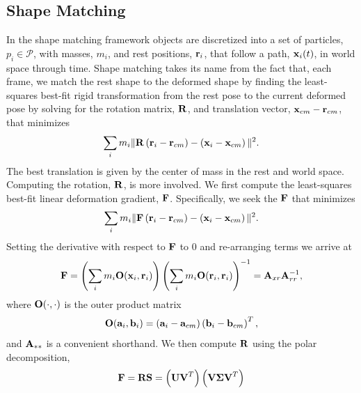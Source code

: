 \documentclass[review]{acmsiggraph}
\begin{document}
\subsection{Shape Matching}
\label{sec:ShapeMatching}
In the shape matching framework
objects are discretized into a set of particles, $p_i\in\mathcal{P}$, with masses, $m_i$, and rest positions, $\mathit{\mathbf{r}}_i$, 
that follow a path, $\mathit{\mathbf{x}}_i(t)$, in world space through time.
Shape matching takes its name from the fact that, each frame, we match the rest shape to 
the deformed shape by finding
the least-squares best-fit rigid transformation from the rest pose
to the current deformed pose by
solving for the rotation matrix, $\mathit{\mathbf{R}}$, and translation
vector, $\mathit{\mathbf{x}}_{cm}-\mathit{\mathbf{r}}_{cm}$, that minimizes
\begin{equation}
\label{eq:sm}
\sum_i m_i \| \mathit{\mathbf{R}}\left(\mathit{\mathbf{r}}_i - \mathit{\mathbf{r}}_{cm}\right)-\left(\mathit{\mathbf{x}}_i-\mathit{\mathbf{x}}_{cm}\right)\|^2.
\end{equation}
The best translation is given by the center of mass in the rest and world space.
Computing the rotation, $\mathit{\mathbf{R}}$, is more involved.  
We first compute the least-squares best-fit linear deformation gradient, $\mathit{\mathbf{F}}$.
Specifically, we seek the $\mathit{\mathbf{F}}$ that minimizes
\begin{equation}
\sum_i m_i \| \mathit{\mathbf{F}}\left(\mathit{\mathbf{r}}_i - \mathit{\mathbf{r}}_{cm}\right)-\left(\mathit{\mathbf{x}}_i-\mathit{\mathbf{x}}_{cm}\right)\|^2.
\end{equation}
Setting the derivative with respect to $\mathit{\mathbf{F}}$ to $0$ and re-arranging terms we arrive at
\begin{equation}
\label{eq:defgrad}
\mathit{\mathbf{F}} = \left(\sum_i m_i \mathit{\mathbf{O}}(\mathit{\mathbf{x}}_i,\mathit{\mathbf{r}}_i)\right)\left(\sum_im_i\mathit{\mathbf{O}}(\mathit{\mathbf{r}}_i,\mathit{\mathbf{r}}_i)\right)^{-1} = \mathit{\mathbf{A}}_{xr}\mathit{\mathbf{A}}_{rr}^{-1},
\end{equation}
where $\mathit{\mathbf{O}}(\cdot,\cdot)$ is the outer product matrix
\begin{equation}
\mathit{\mathbf{O}}(\mathit{\mathbf{a}}_i,\mathit{\mathbf{b}}_i) = \left(\mathit{\mathbf{a}}_i-\mathit{\mathbf{a}}_{cm}\right)\left(\mathit{\mathbf{b}}_{i}-\mathit{\mathbf{b}}_{cm}\right)^T,
\end{equation}
and $\mathit{\mathbf{A}}_{**}$ is a convenient shorthand.
We then compute $\mathit{\mathbf{R}}$ using the polar decomposition,
\begin{equation}
\label{eq:decomp}
\mathit{\mathbf{F}} = \mathit{\mathbf{R}}\mathit{\mathbf{S}} = \left(\mathit{\mathbf{UV}}^T\right)\left(\mathit{\mathbf{V\Sigma V}}^T\right)
\end{equation}
\end{document}
